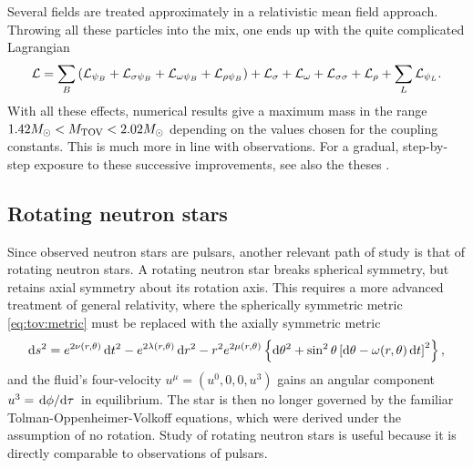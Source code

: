 Several fields are treated approximately in a relativistic mean field approach.
Throwing all these particles into the mix, one ends up with the quite complicated Lagrangian
\begin{equation}
\begin{split}
	\mathcal{L} &= \sum_B \left( \mathcal{L}_{\psi_B} + \mathcal{L}_{\sigma \psi_{B}} + \mathcal{L}_{\omega \psi_{B}} + \mathcal{L}_{\rho \psi_{B}} \right) + \mathcal{L}_\sigma + \mathcal{L}_\omega + \mathcal{L}_{\sigma \sigma} + \mathcal{L}_\rho + \sum_L \mathcal{L}_{\psi_L} . \\
\end{split}
\end{equation}
With all these effects, numerical results give a maximum mass in the range $1.42 M_\odot < M_\text{TOV} < 2.02 M_\odot$ depending on the values chosen for the coupling constants. \cite[table 1]{ref:neutron_star_hyperon_effect}
This is much more in line with observations.
For a gradual, step-by-step exposure to these successive improvements, see also the theses \cite{ref:master_caroline,ref:master_francesco}.

\subsection*{Rotating neutron stars}

Since observed neutron stars are pulsars, another relevant path of study is that of rotating neutron stars.
A rotating neutron star breaks spherical symmetry, but retains axial symmetry about its rotation axis.
This requires a more advanced treatment of general relativity, where the spherically symmetric metric \eqref{eq:tov:metric} must be replaced with the axially symmetric metric
\cite[section 6]{ref:glendenning}
\begin{equation}
	\mathop{}\!\mathrm{d} s^2 = e^{2\nu(r,\theta)} \mathop{}\!\mathrm{d} t^2 - e^{2\lambda(r,\theta)} \mathop{}\!\mathrm{d} r^2 - r^2 e^{2 \mu(r,\theta)} \left\{ \mathop{}\!\mathrm{d} \theta^2 + \sin^2 \theta \left[ \mathop{}\!\mathrm{d} \theta  - \omega(r,\theta) \mathop{}\!\mathrm{d} t \right]^2 \right\} ,
\end{equation}
and the fluid's four-velocity $u^\mu = (u^0, 0, 0, u^3)$ gains an angular component $u^3 = \odv{\phi}/{\tau}$ in equilibrium.
The star is then no longer governed by the familiar Tolman-Oppenheimer-Volkoff equations, which were derived under the assumption of no rotation.
Study of rotating neutron stars is useful because it is directly comparable to observations of pulsars.

